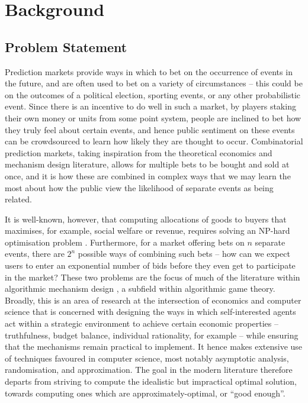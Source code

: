 \documentclass[10pt,a4paper]{article}
\theoremstyle{plain}
\theoremstyle{definition}
\begin{document}
\section{Background}
	\label{sec:background}

	\subsection{Problem Statement}

	Prediction markets provide ways in which to bet on the occurrence of events
	in the future, and are often used to bet on a variety of circumstances --
	this could be on the outcomes of a political election, sporting events, or
	any other probabilistic event. Since there is an incentive to do well in
	such a market, by players staking their own money or units from some point
	system, people are inclined to bet how they truly feel about certain
	events, and hence public sentiment on these events can be crowdsourced to
	learn how likely they are thought to occur. Combinatorial prediction
	markets, taking inspiration from the theoretical economics and mechanism
	design literature, allows for multiple bets to be bought and sold at once,
	and it is how these are combined in complex ways that we may learn the most
	about how the public view the likelihood of separate events as being
	related.

	It is well-known, however, that computing allocations of goods to buyers
	that maximises, for example, social welfare or revenue, requires solving an
	NP-hard optimisation problem \cite{VCGNPhard}. Furthermore, for a market
	offering bets on $n$ separate events, there are $2^n$ possible ways of
	combining such bets -- how can we expect users to enter an exponential
	number of bids before they even get to participate in the market? These two
	problems are the focus of much of the literature within algorithmic
	mechanism design \cite{AMD}, a subfield within algorithmic game theory.
	Broadly, this is an area of research at the intersection of economics and
	computer science that is concerned with designing the ways in which
	self-interested agents act within a strategic environment to achieve
	certain economic properties -- truthfulness, budget balance, individual
	rationality, for example -- while ensuring that the mechanisms remain
	practical to implement. It hence makes extensive use of techniques favoured
	in computer science, most notably asymptotic analysis, randomisation, and
	approximation. The goal in the modern literature therefore departs from
	striving to compute the idealistic but impractical optimal solution,
	towards computing ones which are approximately-optimal, or ``good enough''.
\end{document}

